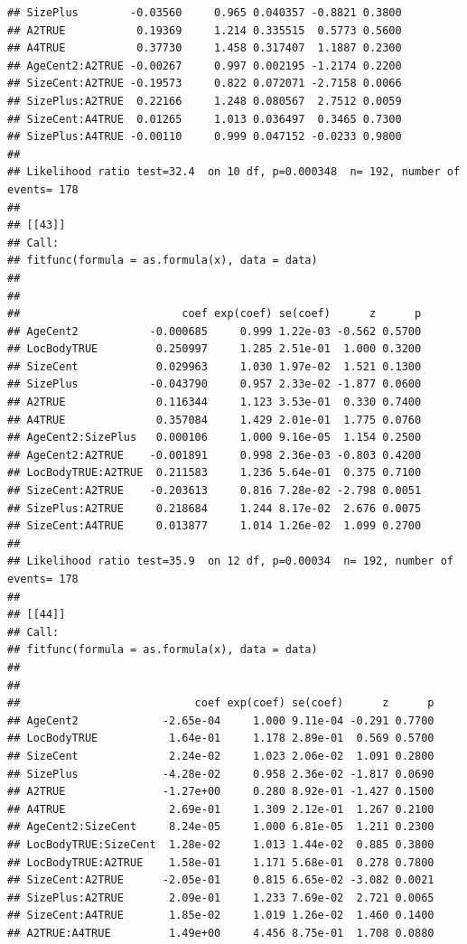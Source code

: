 \documentclass{article}\usepackage[]{graphicx}\usepackage[]{color}
\makeatletter
\newenvironment{kframe}{%
 \def\at@end@of@kframe{}%
 \ifinner\ifhmode%
  \def\at@end@of@kframe{\end{minipage}}%
  \begin{minipage}{\columnwidth}%
 \fi\fi%
 \def\FrameCommand##1{\hskip\@totalleftmargin \hskip-\fboxsep
 \colorbox{shadecolor}{##1}\hskip-\fboxsep
     \hskip-\linewidth \hskip-\@totalleftmargin \hskip\columnwidth}%
 \MakeFramed {\advance\hsize-\width
   \@totalleftmargin\z@ \linewidth\hsize
   \@setminipage}}%
 {\par\unskip\endMakeFramed%
 \at@end@of@kframe}
\newenvironment{knitrout}{}{} %
\makeatother
\begin{document}
\begin{knitrout}
\begin{kframe}
\begin{verbatim}
## SizePlus        -0.03560     0.965 0.040357 -0.8821 0.3800
## A2TRUE           0.19369     1.214 0.335515  0.5773 0.5600
## A4TRUE           0.37730     1.458 0.317407  1.1887 0.2300
## AgeCent2:A2TRUE -0.00267     0.997 0.002195 -1.2174 0.2200
## SizeCent:A2TRUE -0.19573     0.822 0.072071 -2.7158 0.0066
## SizePlus:A2TRUE  0.22166     1.248 0.080567  2.7512 0.0059
## SizeCent:A4TRUE  0.01265     1.013 0.036497  0.3465 0.7300
## SizePlus:A4TRUE -0.00110     0.999 0.047152 -0.0233 0.9800
## 
## Likelihood ratio test=32.4  on 10 df, p=0.000348  n= 192, number of events= 178 
## 
## [[43]]
## Call:
## fitfunc(formula = as.formula(x), data = data)
## 
## 
##                         coef exp(coef) se(coef)      z      p
## AgeCent2           -0.000685     0.999 1.22e-03 -0.562 0.5700
## LocBodyTRUE         0.250997     1.285 2.51e-01  1.000 0.3200
## SizeCent            0.029963     1.030 1.97e-02  1.521 0.1300
## SizePlus           -0.043790     0.957 2.33e-02 -1.877 0.0600
## A2TRUE              0.116344     1.123 3.53e-01  0.330 0.7400
## A4TRUE              0.357084     1.429 2.01e-01  1.775 0.0760
## AgeCent2:SizePlus   0.000106     1.000 9.16e-05  1.154 0.2500
## AgeCent2:A2TRUE    -0.001891     0.998 2.36e-03 -0.803 0.4200
## LocBodyTRUE:A2TRUE  0.211583     1.236 5.64e-01  0.375 0.7100
## SizeCent:A2TRUE    -0.203613     0.816 7.28e-02 -2.798 0.0051
## SizePlus:A2TRUE     0.218684     1.244 8.17e-02  2.676 0.0075
## SizeCent:A4TRUE     0.013877     1.014 1.26e-02  1.099 0.2700
## 
## Likelihood ratio test=35.9  on 12 df, p=0.00034  n= 192, number of events= 178 
## 
## [[44]]
## Call:
## fitfunc(formula = as.formula(x), data = data)
## 
## 
##                           coef exp(coef) se(coef)      z      p
## AgeCent2             -2.65e-04     1.000 9.11e-04 -0.291 0.7700
## LocBodyTRUE           1.64e-01     1.178 2.89e-01  0.569 0.5700
## SizeCent              2.24e-02     1.023 2.06e-02  1.091 0.2800
## SizePlus             -4.28e-02     0.958 2.36e-02 -1.817 0.0690
## A2TRUE               -1.27e+00     0.280 8.92e-01 -1.427 0.1500
## A4TRUE                2.69e-01     1.309 2.12e-01  1.267 0.2100
## AgeCent2:SizeCent     8.24e-05     1.000 6.81e-05  1.211 0.2300
## LocBodyTRUE:SizeCent  1.28e-02     1.013 1.44e-02  0.885 0.3800
## LocBodyTRUE:A2TRUE    1.58e-01     1.171 5.68e-01  0.278 0.7800
## SizeCent:A2TRUE      -2.05e-01     0.815 6.65e-02 -3.082 0.0021
## SizePlus:A2TRUE       2.09e-01     1.233 7.69e-02  2.721 0.0065
## SizeCent:A4TRUE       1.85e-02     1.019 1.26e-02  1.460 0.1400
## A2TRUE:A4TRUE         1.49e+00     4.456 8.75e-01  1.708 0.0880

\end{verbatim}
\end{kframe}
\end{knitrout}
\end{document}
